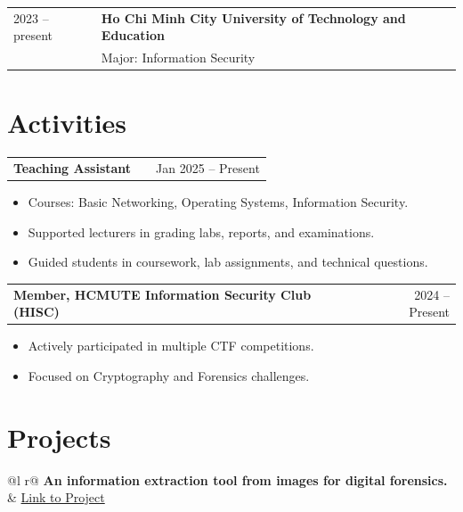 \documentclass[a4paper,12pt]{article}
\makeatletter
\newenvironment{joblong}[2]
    {
    \begin{tabularx}{\linewidth}{@{}l X r@{}}
    \textbf{#1} & \hfill &  #2 \\[3.75pt]
    \end{tabularx}
    \begin{minipage}[t]{\linewidth}
    \begin{itemize}[nosep,after=\strut, leftmargin=1em, itemsep=3pt,label=--]
    }
    {
    \end{itemize}
    \end{minipage}    
    }
\makeatother
\begin{document}
\begin{tabular*}{\linewidth}{@{\extracolsep{\fill}}ll}
2023 -- present & \textbf{Ho Chi Minh City University of Technology and Education} \\
                & Major: Information Security \\
\end{tabular*}

\section{Activities}

\begin{joblong}{Teaching Assistant}{Jan 2025 -- Present}
\item Courses: Basic Networking, Operating Systems, Information Security.
\item Supported lecturers in grading labs, reports, and examinations.
\item Guided students in coursework, lab assignments, and technical questions.
\end{joblong}

\begin{joblong}{Member, HCMUTE Information Security Club (HISC)}{2024 -- Present}
\item Actively participated in multiple CTF competitions.
\item Focused on Cryptography and Forensics challenges.
\end{joblong}

\section{Projects}

\begin{tabularx}{\linewidth}{ @{}l r@{} }
\textbf{An information extraction tool from images for digital forensics.} & \hfill \href{https://github.com/raviyelna/Project_Demo}{Link to Project} \\[3.75pt]
  \\
\end{tabularx}




\end{document}
